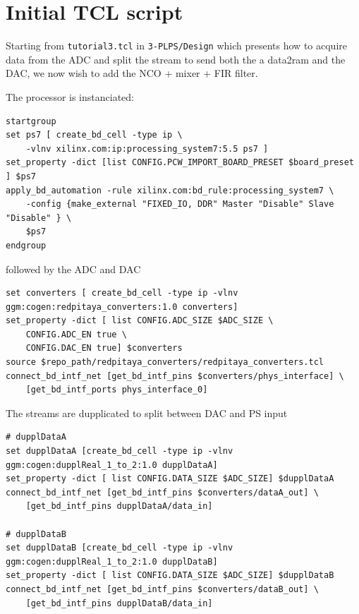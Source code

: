 \documentclass[12pt,oneside]{article}
\begin{document}
\section{Initial TCL script}

Starting from {\tt tutorial3.tcl} in {\tt 3-PLPS/Design} which presents how to acquire data 
from the ADC and split the stream to send both the a data2ram and the DAC, we now wish to 
add the NCO + mixer + FIR filter.

The processor is instanciated:
{\footnotesize
\begin{verbatim}
startgroup
set ps7 [ create_bd_cell -type ip \
	-vlnv xilinx.com:ip:processing_system7:5.5 ps7 ]
set_property -dict [list CONFIG.PCW_IMPORT_BOARD_PRESET $board_preset ] $ps7
apply_bd_automation -rule xilinx.com:bd_rule:processing_system7 \
	-config {make_external "FIXED_IO, DDR" Master "Disable" Slave "Disable" } \
	$ps7
endgroup
\end{verbatim}
}

\noindent
followed by the ADC and DAC

{\footnotesize
\begin{verbatim}
set converters [ create_bd_cell -type ip -vlnv ggm:cogen:redpitaya_converters:1.0 converters]
set_property -dict [ list CONFIG.ADC_SIZE $ADC_SIZE \
	CONFIG.ADC_EN true \
	CONFIG.DAC_EN true] $converters
source $repo_path/redpitaya_converters/redpitaya_converters.tcl
connect_bd_intf_net [get_bd_intf_pins $converters/phys_interface] \
	[get_bd_intf_ports phys_interface_0]
\end{verbatim}
}

The streams are dupplicated to split between DAC and PS input

{\footnotesize
\begin{verbatim}
# dupplDataA
set dupplDataA [create_bd_cell -type ip -vlnv ggm:cogen:dupplReal_1_to_2:1.0 dupplDataA]
set_property -dict [ list CONFIG.DATA_SIZE $ADC_SIZE] $dupplDataA
connect_bd_intf_net [get_bd_intf_pins $converters/dataA_out] \
	[get_bd_intf_pins dupplDataA/data_in]

# dupplDataB
set dupplDataB [create_bd_cell -type ip -vlnv ggm:cogen:dupplReal_1_to_2:1.0 dupplDataB]
set_property -dict [ list CONFIG.DATA_SIZE $ADC_SIZE] $dupplDataB
connect_bd_intf_net [get_bd_intf_pins $converters/dataB_out] \
	[get_bd_intf_pins dupplDataB/data_in]
\end{verbatim}
}
\end{document}
